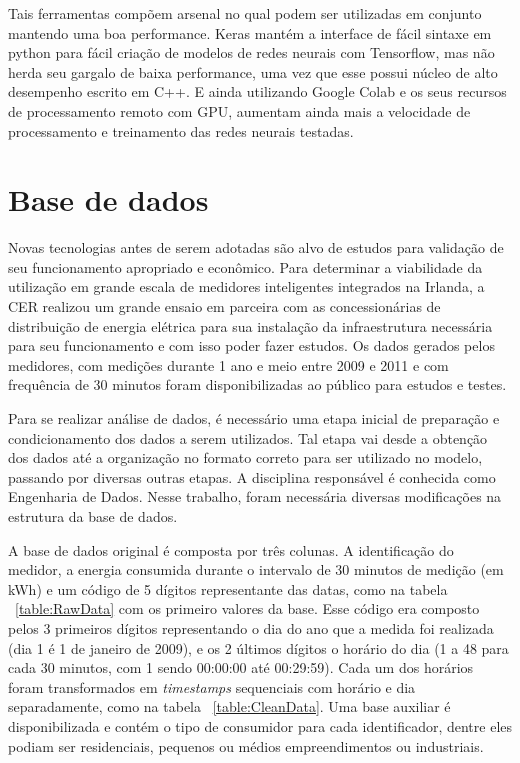 \documentclass[
	12pt,				%
	oneside,			%
	a4paper,			%
	english,			%
	brazil				%
	]{abntex2}
\begin{document}

Tais ferramentas compõem arsenal no qual podem ser utilizadas em conjunto mantendo uma boa performance. Keras mantém a interface de fácil sintaxe em python para fácil criação de modelos de redes neurais com Tensorflow, mas não herda seu gargalo de baixa performance, uma vez que esse possui núcleo de alto desempenho escrito em C++. E ainda utilizando Google Colab e os seus recursos de processamento remoto com GPU, aumentam ainda mais a velocidade de processamento e treinamento das redes neurais testadas. 

\section{Base de dados}
	
	Novas tecnologias antes de serem adotadas são alvo de estudos para validação de seu funcionamento apropriado e econômico. Para determinar a viabilidade da utilização em grande escala de medidores inteligentes integrados na Irlanda, a CER realizou um grande ensaio em parceira com as concessionárias de distribuição de energia elétrica para sua instalação da infraestrutura necessária para seu funcionamento e com isso poder fazer estudos. Os dados gerados pelos medidores, com medições durante 1 ano e meio entre 2009 e 2011 e com frequência de 30 minutos foram disponibilizadas ao público para estudos e testes. 
	
	
	Para se realizar análise de dados, é necessário uma etapa inicial de preparação e condicionamento dos dados a serem utilizados. Tal etapa vai desde a obtenção dos dados até a organização no formato correto para ser utilizado no modelo, passando por diversas outras etapas. A disciplina responsável é conhecida como Engenharia de Dados. Nesse trabalho, foram necessária diversas modificações na estrutura da base de dados. 
	
	A base de dados original é composta por três colunas. A identificação do medidor, a energia consumida durante o intervalo de 30 minutos de medição (em kWh) e um código de 5 dígitos representante das datas, como na tabela ~\ref{table:RawData} com os primeiro valores da base. Esse código era composto pelos 3 primeiros dígitos representando o dia do ano que a medida foi realizada (dia 1 é 1 de janeiro de 2009), e os 2 últimos dígitos o horário do dia (1 a 48 para cada 30 minutos, com 1 sendo 00:00:00 até 00:29:59). Cada um dos horários foram transformados em \textit{timestamps} sequenciais com horário e dia separadamente, como na tabela ~\ref{table:CleanData}. Uma base auxiliar é disponibilizada e contém o tipo de consumidor para cada identificador, dentre eles podiam ser residenciais, pequenos ou médios empreendimentos ou industriais. 
	
\end{document}
